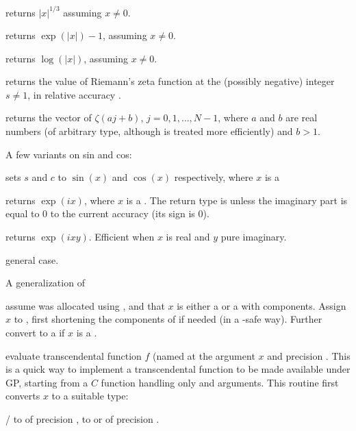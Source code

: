  returns $|x|^{1/3}$ assuming $x\neq 0$.

 returns $\exp(|x|) - 1$, assuming $x \neq 0$.

 returns $\log(|x|)$, assuming $x \neq 0$.


 returns the value of Riemann's zeta
function at the (possibly negative) integer $s\neq 1$, in relative accuracy
.

 returns the vector
of $\zeta(aj + b)$, $j = 0, 1, \dots, N-1$, where $a$ and $b$ are real
numbers (of arbitrary type, although  is treated more efficiently)
and $b > 1$.

\noindent A few variants on sin and cos:

 sets $s$ and $c$ to
$\sin(x)$ and $\cos(x)$ respectively, where $x$ is a 

 returns $\exp(ix)$, where $x$ is a .
The return type is  unless the imaginary part is equal to $0$
to the current accuracy (its sign is $0$).

 returns $\exp(ixy)$. Efficient
when $x$ is real and $y$ pure imaginary.

 general case.

\noindent A generalization of 

 assume  was allocated using
, and that $x$ is either a  or a 
with  components. Assign $x$ to , first shortening
the components of  if needed (in a -safe way). Further
convert  to a  if $x$ is a .

evaluate transcendental function $f$ (named  at the argument
$x$ and precision . This is a quick way to implement a transcendental
function to be made available under GP, starting from a $C$ function
handling only  and  arguments. This routine first
converts $x$ to a suitable type:

\item {}/ to  of precision ,  to
 or  of precision .

